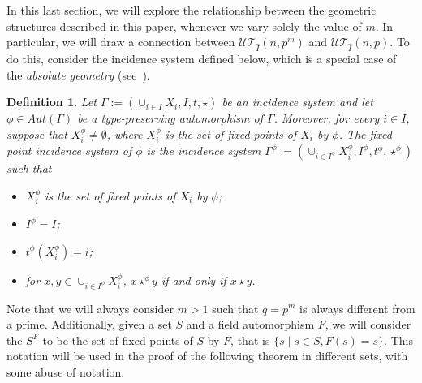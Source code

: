 \documentclass[11pt,letterpaper]{amsart}
\newtheorem{definition}[theorem]{Definition}
\newcommand{\TT}{\mathcal{T}}
\newcommand{\UU}{\mathcal{U}}
\begin{document}
In this last section, we will explore the relationship between the geometric structures described in this paper, whenever we vary solely the value of $m$. In particular, we will draw a connection between $\UU\TT_{\widehat{I}}(n,p^m)$ and $\UU\TT_{\widehat{I}}(n,p)$.
To do this, consider the incidence system defined below, which is a special case of the \emph{absolute geometry} (see~\cite{buekenhout2013diagram}).

\begin{definition}
    Let $\Gamma :=(\cup_{i\in I}X_i,I,t,\star)$ be an incidence system and let $\phi \in Aut(\Gamma)$ be a type-preserving automorphism of $\Gamma$. Moreover, for every $i\in I$, suppose that $X_i^\phi \neq \emptyset$, where $X_i^\phi$ is the set of fixed points of $X_i$ by $\phi$.
    The \emph{fixed-point incidence system of $\phi$} is the incidence system $\Gamma^\phi :=(\cup_{i\in I^\phi}X_i^\phi, I^\phi, t^\phi,\star^\phi)$ such that 
    \begin{itemize}
        \item $X_i^\phi$ is the set of fixed points of $X_i$ by $\phi$;
        \item $I^\phi = I$;
        \item $t^\phi(X_i^\phi) = i$;
        \item for $x,y \in \cup_{i\in I^\phi} X_i^\phi$, $ x \star^\phi y$ if and only if $x\star y$.
    \end{itemize}
\end{definition}



Note that we will always consider $m>1$ such that $q=p^m $ is always different from a prime. Additionally, given a set $S$ and a field automorphism $F$, we will consider the $S^F$ to be the set of fixed points of $S$ by $F$, that is $\{s \mid s\in S, F(s)=s\}$. This notation will be used in the proof of the following theorem in different sets, with some abuse of notation.
\end{document}

